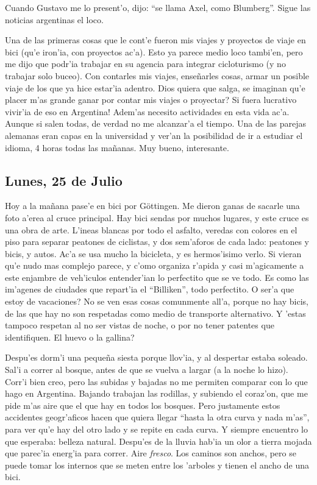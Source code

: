 Cuando Gustavo me lo present'o, dijo: ``se llama Axel, como Blumberg''. Sigue
las noticias argentinas el loco.

Una de las primeras cosas que le cont'e fueron mis viajes y proyectos de viaje
en bici (qu'e iron'ia, con proyectos ac'a). Esto ya parece medio loco tambi'en,
pero me dijo que podr'ia trabajar en su agencia para integrar cicloturismo (y no
trabajar solo buceo). Con contarles mis viajes, ense\~narles cosas, armar un
posible viaje de los que ya hice estar'ia adentro. Dios quiera que salga,
\textquestiondown se imaginan qu'e placer m'as grande ganar 
por contar mis viajes o proyectar? \textexclamdown Si fuera lucrativo vivir'ia
de eso en Argentina! Adem'as necesito actividades en esta vida ac'a. Aunque si
salen todas, de verdad no me alcanzar'a el tiempo. Una de las parejas alemanas
eran capas en la universidad y ver'an la posibilidad de ir a estudiar el idioma,
4 horas todas las ma\~nanas. Muy bueno, interesante.

\subsection*{Lunes, 25 de Julio}

Hoy a la ma\~nana pase'e en bici por G\"ottingen. Me dieron ganas de sacarle una
foto a'erea al cruce principal. Hay bici sendas por muchos lugares, y este cruce
es una obra de arte. L'ineas blancas por todo el asfalto, veredas con colores en
el piso para separar peatones de ciclistas, y dos sem'aforos de cada lado:
peatones y bicis, y autos. Ac'a se usa mucho la bicicleta, y es hermos'isimo
verlo. Si vieran qu'e nudo mas complejo parece, y c'omo organiza r'apida y casi
m'agicamente a este enjambre de veh'iculos entender'ian lo perfectito que se ve
todo. Es como las im'agenes de ciudades que repart'ia el ``Billiken'', todo
perfectito. \textquestiondown O ser'a que estoy de vacaciones? No se ven esas
cosas comunmente all'a, porque no hay bicis, de las que hay no son respetadas
como medio de transporte alternativo. Y 'estas tampoco respetan al no ser vistas
de noche, o por no tener patentes que identifiquen. \textquestiondown El huevo o
la gallina?

Despu'es dorm'i una peque\~na siesta porque llov'ia, y al despertar estaba
soleado. Sal'i a correr al bosque, antes de que se vuelva a largar (a la noche
lo hizo). Corr'i bien creo, pero las subidas y bajadas no me permiten comparar
con lo que hago en Argentina. Bajando trabajan las rodillas, y subiendo el
coraz'on, que me pide m'as aire que el que hay en todos los bosques. Pero
justamente estos accidentes geogr'aficos hacen que quiera llegar ``hasta la otra
curva y nada m'as'', para ver qu'e hay del otro lado y se repite en cada curva.
Y siempre encuentro lo que esperaba: belleza natural. Despu'es de la lluvia
hab'ia un olor a tierra mojada que parec'ia energ'ia para correr. Aire
\emph{fresco}. Los caminos son anchos, pero se puede tomar los internos que se
meten entre los 'arboles y tienen el ancho de una bici.

